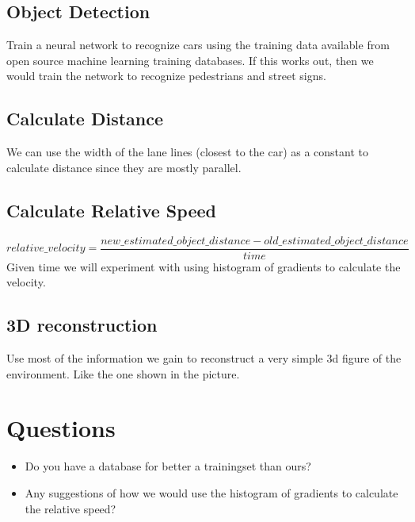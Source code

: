 \documentclass{article}
\begin{document}
\subsection{Object Detection}
Train a neural network to recognize cars using the training data available from open source machine learning training databases.
If this works out, then we would train the network to recognize pedestrians and street signs.

\subsection{Calculate Distance}
We can use the width of the lane lines (closest to the car) as a constant to calculate distance since they are mostly parallel.


\subsection{Calculate Relative Speed}
$$relative\_velocity = \frac{new\_estimated\_object\_distance - old\_estimated\_object\_distance}{time}$$
Given time we will experiment with using histogram of gradients to calculate the velocity.

\subsection{3D reconstruction}
Use most of the information we gain to reconstruct a very simple 3d figure of the environment. Like the one shown in the picture.

\section{Questions}
\begin{itemize}
\item Do you have a database for better a trainingset than ours?
\item Any suggestions of how we would use the histogram of gradients to calculate the relative speed?
\end{itemize}
\end{document}
